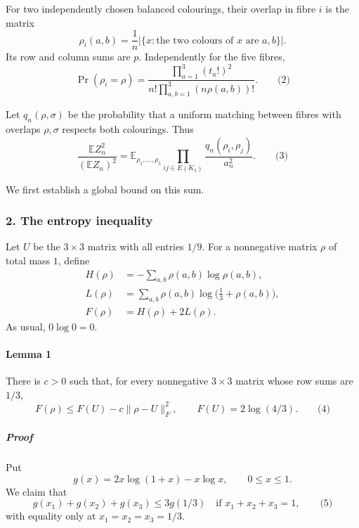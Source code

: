 \documentclass[
  11pt,
  a4paper,
]{article}
\begin{document}
For two independently chosen balanced colourings, their overlap in fibre
\(i\) is the matrix \[
\rho_i(a,b)=\frac1n
 \bigl|\{x:\text{the two colours of }x\text{ are }a,b\}\bigr|.
\] Its row and column sums are \(p\). Independently for the five fibres,
\[
\Pr(\rho_i=\rho)
 =\frac{\prod_{a=1}^3(t_a!)^2}
        {n!\prod_{a,b=1}^3(n\rho(a,b))!}.                         \qquad\text{(2)}
\]

Let \(q_n(\rho,\sigma)\) be the probability that a uniform matching
between fibres with overlaps \(\rho,\sigma\) respects both colourings.
Thus \[
\frac{\mathbb E Z_n^2}{(\mathbb E Z_n)^2}
 =
 \mathbb E_{\rho_1,\ldots,\rho_5}
 \prod_{ij\in E(K_5)}\frac{q_n(\rho_i,\rho_j)}{a_n^2}.             \qquad\text{(3)}
\]

We first establish a global bound on this sum.

\subsubsection{2. The entropy inequality}\label{the-entropy-inequality}

Let \(U\) be the \(3\times3\) matrix with all entries \(1/9\). For a
nonnegative matrix \(\rho\) of total mass \(1\), define
\begin{equation*}
\begin{split}
H(\rho)&=-\sum_{a,b}\rho(a,b)\log\rho(a,b),\\
L(\rho)&=\sum_{a,b}\rho(a,b)\log\bigl(\tfrac13+\rho(a,b)\bigr),\\
F(\rho)&=H(\rho)+2L(\rho).
\end{split}
\end{equation*} As usual, \(0\log0=0\).

\paragraph{Lemma 1}\label{lemma-1}

There is \(c>0\) such that, for every nonnegative \(3\times3\) matrix
whose row sums are \(1/3\), \[
F(\rho)\le F(U)-c\|\rho-U\|_F^2,
\qquad
F(U)=2\log(4/3).                                                  \qquad\text{(4)}
\]

\subparagraph{Proof}\label{proof}

Put \[
g(x)=2x\log(1+x)-x\log x,\qquad 0\le x\le1.
\] We claim that \[
g(x_1)+g(x_2)+g(x_3)\le 3g(1/3)
\quad\text{if }x_1+x_2+x_3=1,                                   \qquad\text{(5)}
\] with equality only at \(x_1=x_2=x_3=1/3\).
\end{document}
